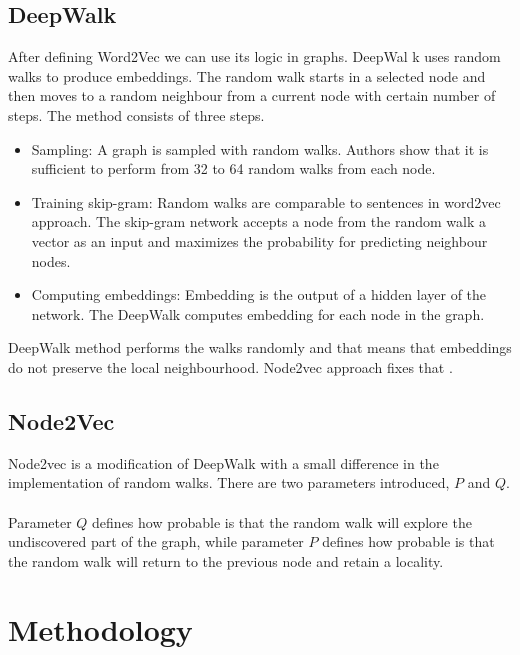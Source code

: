 \subsection{DeepWalk}		

 After defining Word2Vec we can use its logic in graphs. DeepWal k uses random walks to produce embeddings. The random walk starts in a selected node and then moves to a random neighbour from a current node with certain number of steps. The method consists of three steps.		

\begin{itemize}		
\item Sampling: A graph is sampled with random walks. Authors show that it is sufficient to perform from 32 to 64 random walks from each node. 		
 
\item Training skip-gram: Random walks are comparable to sentences in word2vec approach. The skip-gram network accepts a node from the random walk a vector as an input and maximizes the probability for predicting neighbour nodes. 		

\item Computing embeddings: Embedding is the output of a hidden layer of the network. The DeepWalk computes embedding for each node in the graph.		

\end{itemize}		

\noindent  DeepWalk method performs the walks randomly and that means that embeddings do not preserve the local neighbourhood. Node2vec approach fixes that \cite{bperozzi}.

\subsection{Node2Vec}		

Node2vec is a modification of DeepWalk with a small difference in  the implementation of random walks. There are two parameters introduced, $P$ and $Q$. 		
 \\		
 \\		
 Parameter $Q$ defines how probable is that the random walk will explore the undiscovered part of the graph, while parameter $P$ defines how probable is that the random walk will return to the previous node and retain a locality\cite{Leskovec}.

\section{Methodology}		
\label{sec:methodology}		

